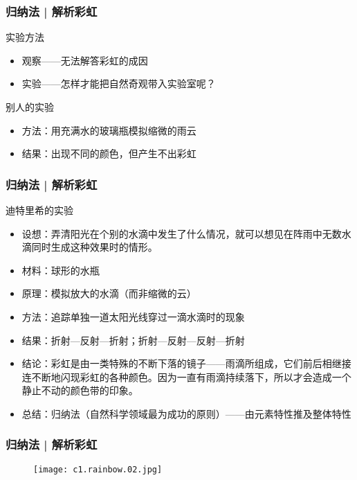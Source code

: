 \begin{frame}
  \frametitle{归纳法 | 解析彩虹}
  \begin{block}{实验方法}
    \begin{itemize}
      \item 观察——无法解答彩虹的成因
      \item 实验——怎样才能把自然奇观带入实验室呢？
    \end{itemize}
  \end{block}
  \pause
  \begin{block}{别人的实验}
    \begin{itemize}
      \item 方法：用充满水的玻璃瓶模拟缩微的雨云
      \item 结果：出现不同的颜色，但产生不出彩虹
    \end{itemize}
  \end{block}
\end{frame}

\begin{frame}
  \frametitle{归纳法 | 解析彩虹}
  \begin{block}{迪特里希的实验}
    \begin{itemize}
      \item 设想：弄清阳光在个别的水滴中发生了什么情况，就可以想见在阵雨中无数水滴同时生成这种效果时的情形。
      \item 材料：球形的水瓶
      \item 原理：模拟放大的水滴（而非缩微的云）
      \item 方法：追踪单独一道太阳光线穿过一滴水滴时的现象
      \item 结果：折射—反射—折射；折射—反射—反射—折射
      \item 结论：彩虹是由一类特殊的不断下落的镜子——雨滴所组成，它们前后相继接连不断地闪现彩虹的各种颜色。因为一直有雨滴持续落下，所以才会造成一个静止不动的颜色带的印象。
      \item 总结：归纳法（自然科学领域最为成功的原则）——由元素特性推及整体特性
    \end{itemize}
  \end{block}
\end{frame}

\begin{frame}
  \frametitle{归纳法 | 解析彩虹}
  \begin{figure}
    \centering
    \texttt{[image: c1.rainbow.02.jpg]}
  \end{figure}
\end{frame}

